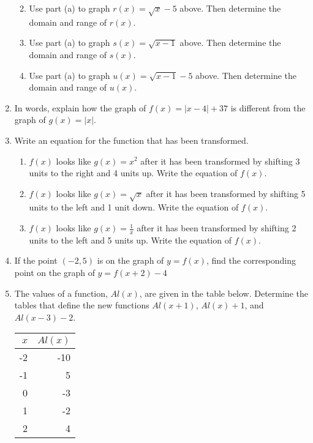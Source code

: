 \begin{enumerate}
\begin{enumerate}
\begin{tikzpicture}[y=.5cm, x=0.5cm,font=\sffamily]
  \end{tikzpicture}

\item Use part (a) to graph $r(x)=\sqrt{x}-5$ above.  Then determine the domain and range of $r(x)$.
\vfill
\item Use part (a) to graph $s(x)=\sqrt{x-1}$ above.  Then determine the domain and range of $s(x)$.
\vfill
\item Use part (a) to graph $u(x)=\sqrt{x-1}-5$ above.  Then determine the domain and range of $u(x)$.
\vfill
\end{enumerate}


\newpage

\item In words, explain how the graph of $f(x)=|x-4|+37$ is different from the graph of $g(x)=|x|$.
\vfill

\item Write an equation for the function that has been transformed.
\begin{enumerate}
\item $f(x)$ looks like $g(x)=x^2$ after it has been transformed by shifting 3 units to the right and 4 units up.  Write the equation of $f(x)$.
\vfill
\item $f(x)$ looks like $g(x)=\sqrt{x}$ after it has been transformed by shifting 5 units to the left and 1 unit down.  Write the equation of $f(x)$.
\vfill
\item $f(x)$ looks like $\displaystyle g(x)=\frac{1}{x}$ after it has been transformed by shifting 2 units to the left and 5 units up.  Write the equation of $f(x)$.
\vfill
\end{enumerate}

\clearpage

\item If the point $(-2,5)$ is on the graph of $y=f(x)$, find the
  corresponding point on the graph of $y=f(x+2)-4$

  \vfill

\item The values of a function, $Al(x)$, are given in the table
  below. Determine the tables that define the new functions $Al(x+1)$,
  $Al(x)+1$, and $Al(x-3)-2$.

  \begin{tabular}{r|r}
    $x$ & $Al(x)$ \\ \hline
    -2 & -10 \\
    -1 &  5 \\
     0 &  -3 \\
     1 &  -2 \\
     2 &  4
  \end{tabular}

  \vfill

\end{enumerate}

